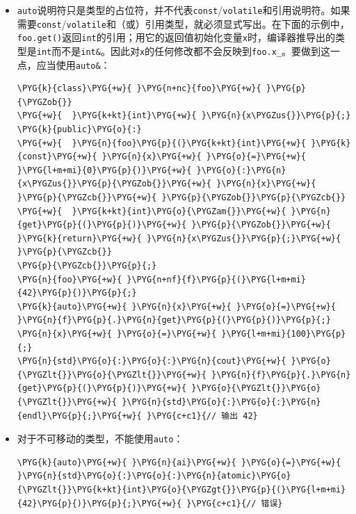 \begin{itemize}
\item \texttt{auto}说明符只是类型的占位符，并不代表\texttt{const}/\texttt{volatile}和引用说明符。如果需要\texttt{const}/\texttt{volatile}和（或）引用类型，就必须显式写出。在下面的示例中，\texttt{foo.\allowbreak{}get()}返回\texttt{int}的引用；用它的返回值初始化变量\texttt{x}时，编译器推导出的类型是\texttt{int}而不是\texttt{int\&}。因此对\texttt{x}的任何修改都不会反映到\texttt{foo.\allowbreak{}x\_}。要做到这一点，应当使用\texttt{auto\&}：



\begin{codeblockbg}
\begin{Verbatim}[commandchars=\\\{\},breaklines=true,breakanywhere=true,fontsize=\codefont,xleftmargin=17bp]
\PYG{k}{class}\PYG{+w}{ }\PYG{n+nc}{foo}\PYG{+w}{ }\PYG{p}{\PYGZob{}}
\PYG{+w}{  }\PYG{k+kt}{int}\PYG{+w}{ }\PYG{n}{x\PYGZus{}}\PYG{p}{;}
\PYG{k}{public}\PYG{o}{:}
\PYG{+w}{  }\PYG{n}{foo}\PYG{p}{(}\PYG{k+kt}{int}\PYG{+w}{ }\PYG{k}{const}\PYG{+w}{ }\PYG{n}{x}\PYG{+w}{ }\PYG{o}{=}\PYG{+w}{ }\PYG{l+m+mi}{0}\PYG{p}{)}\PYG{+w}{ }\PYG{o}{:}\PYG{n}{x\PYGZus{}}\PYG{p}{\PYGZob{}}\PYG{+w}{ }\PYG{n}{x}\PYG{+w}{ }\PYG{p}{\PYGZcb{}}\PYG{+w}{ }\PYG{p}{\PYGZob{}}\PYG{p}{\PYGZcb{}}
\PYG{+w}{  }\PYG{k+kt}{int}\PYG{o}{\PYGZam{}}\PYG{+w}{ }\PYG{n}{get}\PYG{p}{(}\PYG{p}{)}\PYG{+w}{ }\PYG{p}{\PYGZob{}}\PYG{+w}{ }\PYG{k}{return}\PYG{+w}{ }\PYG{n}{x\PYGZus{}}\PYG{p}{;}\PYG{+w}{ }\PYG{p}{\PYGZcb{}}
\PYG{p}{\PYGZcb{}}\PYG{p}{;}
\PYG{n}{foo}\PYG{+w}{ }\PYG{n+nf}{f}\PYG{p}{(}\PYG{l+m+mi}{42}\PYG{p}{)}\PYG{p}{;}
\PYG{k}{auto}\PYG{+w}{ }\PYG{n}{x}\PYG{+w}{ }\PYG{o}{=}\PYG{+w}{ }\PYG{n}{f}\PYG{p}{.}\PYG{n}{get}\PYG{p}{(}\PYG{p}{)}\PYG{p}{;}
\PYG{n}{x}\PYG{+w}{ }\PYG{o}{=}\PYG{+w}{ }\PYG{l+m+mi}{100}\PYG{p}{;}
\PYG{n}{std}\PYG{o}{:}\PYG{o}{:}\PYG{n}{cout}\PYG{+w}{ }\PYG{o}{\PYGZlt{}}\PYG{o}{\PYGZlt{}}\PYG{+w}{ }\PYG{n}{f}\PYG{p}{.}\PYG{n}{get}\PYG{p}{(}\PYG{p}{)}\PYG{+w}{ }\PYG{o}{\PYGZlt{}}\PYG{o}{\PYGZlt{}}\PYG{+w}{ }\PYG{n}{std}\PYG{o}{:}\PYG{o}{:}\PYG{n}{endl}\PYG{p}{;}\PYG{+w}{ }\PYG{c+c1}{// 输出 42}
\end{Verbatim}
\end{codeblockbg}



\item 对于不可移动的类型，不能使用\texttt{auto}：



\begin{codeblockbg}
\begin{Verbatim}[commandchars=\\\{\},breaklines=true,breakanywhere=true,fontsize=\codefont,xleftmargin=17bp]
\PYG{k}{auto}\PYG{+w}{ }\PYG{n}{ai}\PYG{+w}{ }\PYG{o}{=}\PYG{+w}{ }\PYG{n}{std}\PYG{o}{:}\PYG{o}{:}\PYG{n}{atomic}\PYG{o}{\PYGZlt{}}\PYG{k+kt}{int}\PYG{o}{\PYGZgt{}}\PYG{p}{(}\PYG{l+m+mi}{42}\PYG{p}{)}\PYG{p}{;}\PYG{+w}{ }\PYG{c+c1}{// 错误}
\end{Verbatim}
\end{codeblockbg}



\end{itemize}
